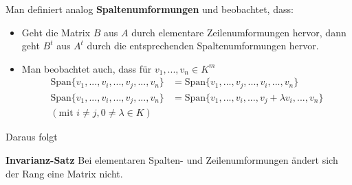 \documentclass[11pt]{report}
\newcommand*\f[1] {\textbf{#1}}
\begin{document}
Man definiert analog \f{Spaltenumformungen} und beobachtet, dass:
\begin{itemize}
 \item Geht die Matrix $B$ aus $A$ durch elementare Zeilenumformungen hervor, dann geht $B^t$ aus $A^t$ durch die entsprechenden Spaltenumformungen hervor.
\item Man beobachtet auch, dass für $v_1, ..., v_n \in K^m$
\begin{align}
 \text{Span}\{v_{1}, ..., v_{i}, ...,  v_{j}, ...,  v_n\} &= \text{Span}\{v_{1}, ..., v_{j}, ...,  v_{i}, ...,  v_n\} \\
\text{Span}\{v_{1}, ..., v_{i}, ...,  v_{j}, ...,  v_n\} &= \text{Span}\{v_{1}, ..., v_{i}, ...,  v_{j}+ \lambda v_i, ...,  v_n\} \\
(\text{mit } i \neq j, 0 \neq \lambda \in K)
\end{align}
\end{itemize}
Daraus folgt

\begin{satz} \f{Invarianz-Satz}
\label{satz523}
Bei elementaren Spalten- und Zeilenumformungen ändert sich der Rang eine Matrix nicht.
\end{satz}
\end{document}
